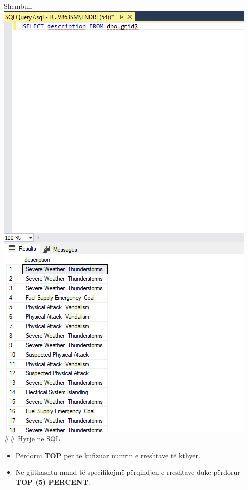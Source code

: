 \documentclass[
  ignorenonframetext,
]{beamer}
\begin{document}
\begin{frame}{Shembull}
\label{shembull-1}
\includegraphics{./Figs/query1.png} \#\# Hyrje në SQL

\begin{itemize}
\item
  Përdorni \textbf{TOP} për të kufizuar numrin e rreshtave të kthyer.
\item
  Ne gjithashtu mund të specifikojmë përqindjen e rreshtave duke
  përdorur \textbf{TOP (5) PERCENT}.
\end{itemize}
\end{frame}
\end{document}

